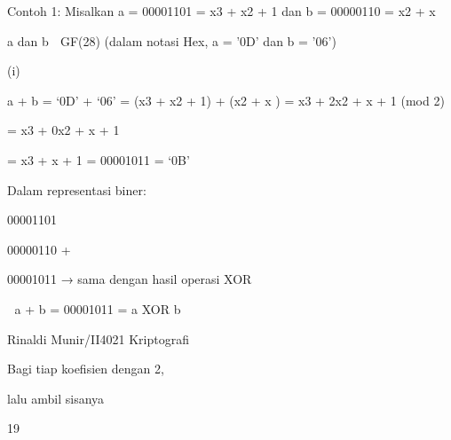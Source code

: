 \documentclass{article}
\begin{document}

Contoh 1:  Misalkan a = 00001101 = x3 + x2 + 1 dan b = 00000110 = x2 + x 


       a dan b  GF(28)      (dalam notasi Hex, a = ’0D’ dan b = ’06’)

(i)

a + b = ‘0D’ + ‘06’ =  (x3 + x2 + 1) +  (x2 + x ) = x3 + 2x2 + x + 1 (mod 2)







   = x3 + 0x2 + x + 1 







   = x3 + x + 1  = 00001011 = ‘0B’


Dalam representasi biner:


00001101


00000110 +


00001011  → sama dengan hasil operasi XOR


 a + b = 00001011 = a XOR b 

Rinaldi Munir/II4021 Kriptografi

Bagi  tiap koefisien dengan 2,

lalu ambil sisanya

19
\end{document}
